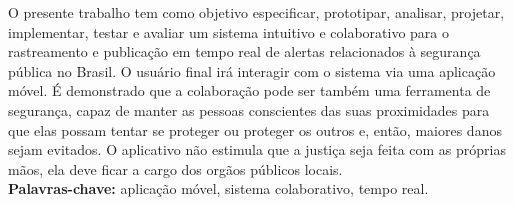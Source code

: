 \documentclass[
	12pt,				%
	openright,			%
	oneside,			%
	a4paper,			%
	english,			%
	french,				%
	spanish,			%
	brazil,				%
	]{lib/abntex2}
\begin{document}




\setlength{\absparsep}{18pt} %
\begin{resumo}
	O presente trabalho tem como objetivo especificar, prototipar, analisar, projetar, implementar, testar e avaliar um sistema intuitivo e colaborativo para o rastreamento e publicação em tempo real de alertas relacionados à segurança pública no Brasil. O usuário final irá interagir com o sistema via uma aplicação móvel. É demonstrado que a colaboração pode ser também uma ferramenta de segurança, capaz de manter as pessoas conscientes das suas proximidades para que elas possam tentar se proteger ou proteger os outros e, então, maiores danos sejam evitados. O aplicativo não estimula que a justiça seja feita com as próprias mãos, ela deve ficar a cargo dos orgãos públicos locais.
	\\
	\textbf{Palavras-chave:} aplicação móvel, sistema colaborativo, tempo real.
\end{resumo}




\listoffigures*
\cleardoublepage
\end{document}
